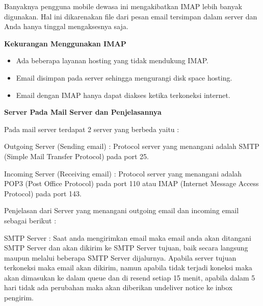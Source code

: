 \documentclass{wileySix}
\begin{document}
\begin{myEnumerate}
	\par
	Banyaknya pengguna mobile dewasa ini mengakibatkan IMAP lebih banyak digunakan. Hal ini dikarenakan file dari pesan email tersimpan dalam server dan Anda hanya tinggal mengaksesnya saja. \par
	\vspace{12pt}
	\textbf{Kekurangan Menggunakan IMAP} \par
	\noindent 
	\begin{itemize}
		\item Ada beberapa layanan hosting yang tidak mendukung IMAP. \par
		\noindent 
		\item Email disimpan pada server sehingga mengurangi disk space hosting. \par
		\noindent 
		\item Email dengan IMAP hanya dapat diakses ketika terkoneksi internet.\end{itemize}
	\par
	\vspace{12pt}
	\noindent 
	\textbf{Server Pada Mail Server dan Penjelasannya} \par
	\noindent 
	Pada mail server terdapat 2 server yang berbeda yaitu : \par
	\noindent 
	\begin{myEnumerate}
		\item Outgoing Server (Sending email) : Protocol server yang menangani adalah SMTP (Simple Mail Transfer Protocol) pada port 25. \par
		\noindent 
		\item Incoming Server (Receiving email) : Protocol server yang menangani adalah POP3 (Post Office Protocol) pada port 110 atau IMAP (Internet Message Access Protocol) pada port 143.\end{myEnumerate}
	\par
	\vspace{12pt}
	\noindent 
	Penjelasan dari Server yang menangani outgoing email dan incoming email sebagai berikut : \par
	\noindent 
	\begin{myEnumerate}
		\item SMTP Server : Saat anda mengirimkan email maka email anda akan ditangani SMTP Server dan akan dikirim ke SMTP Server tujuan, baik secara langsung maupun melalui beberapa SMTP Server dijalurnya. Apabila server tujuan terkoneksi maka email akan dikirim, namun apabila tidak terjadi koneksi maka akan dimasukan ke dalam queue dan di resend setiap 15 menit, apabila dalam 5 hari tidak ada perubahan maka akan diberikan undeliver notice ke inbox pengirim. \par

\end{myEnumerate}
\end{myEnumerate}
\end{document}
